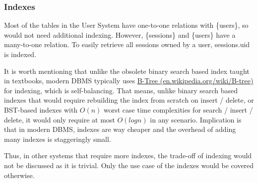 \documentclass[12pt]{report}
\newcommand{\n}{\par}
\begin{document}
\subsubsection{Indexes} \label{data-layer.design.user-system.indexes}
Most of the tables in the User System have one-to-one relations with \{users\},
so would not need additional indexing.
However, \{sessions\} and \{users\} have a many-to-one relation.
To easily retrieve all sessions owned by a user, sessions.uid is indexed.\n
It is worth mentioning that unlike the obsolete binary search based index taught in textbooks,
modern DBMS typically uses \href{https://en.wikipedia.org/wiki/B-tree}{B-Tree (en.wikipedia.org/wiki/B-tree)} for indexing, which is self-balancing.
That means, unlike binary search based indexes that would require rebuilding the index from scratch on insert / delete,
or BST-based indexes with $O(n)$ worst case time complexities for search / insert / delete,
it would only require at most $O(logn)$ in any scenario.
Implication is that in modern DBMS, indexes are way cheaper and the overhead of adding many indexes is staggeringly small.\n
Thus, in other systems that require more indexes, the trade-off of indexing would not be discussed as it is trivial.
Only the use case of the indexes would be covered otherwise.
\end{document}

